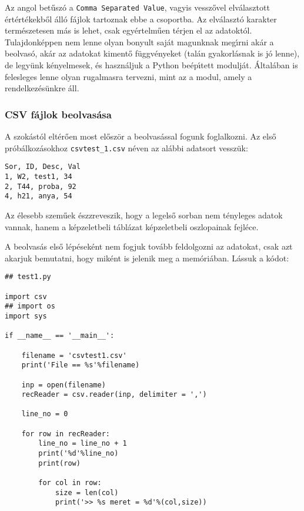 Az angol bet\H{u}sz\'o a {\tt Comma Separated Value}, vagyis vessz\H{o}vel elv\'alasztott 
\'ert\'ert\'ekekb\H{o}l \'all\'o f\'ajlok tartoznak ebbe a csoportba. Az elv\'alaszt\'o 
karakter term\'eszetesen m\'as is lehet, csak egy\'ertelm\H{u}en t\'erjen el az adatokt\'ol. 
Tulajdonk\'eppen nem lenne olyan bonyult saj\'at magunknak meg\'{\i}rni ak\'ar a beolvas\'o, 
ak\'ar az adatokat kiment\H{o} f\"uggv\'enyeket (tal\'an gyakorl\'asnak is j\'o lenne), 
de legy\"unk k\'enyelmesek, \'es haszn\'aljuk a Python be\'ep\'{\i}tett modulj\'at. 
\'Altal\'aban is felesleges lenne olyan rugalmasra tervezni, mint az a modul, amely a 
rendelkez\'es\"unkre \'all.

\subsubsection{CSV f\'ajlok beolvas\'asa}

A szok\'ast\'ol elt\'er\H{o}en most el\H{o}sz\"or a beolvas\'assal fogunk foglalkozni. Az 
els\H{o} pr\'ob\'alkoz\'asokhoz {\tt csvtest\_1.csv} n\'even az al\'abbi adatsort vessz\"uk:

\begin{Verbatim}[fontsize=\small]
Sor, ID, Desc, Val
1, W2, test1, 34
2, T44, proba, 92
4, h21, anya, 54
\end{Verbatim}

\noindent Az \'elesebb szem\H{u}ek \'eszzreveszik, hogy a legels\H{o} sorban nem t\'enyleges adatok 
vannak, hanem a k\'epzeletbeli t\'abl\'azat k\'epzeletbeli oszlopainak fejl\'ece. 

A beolvas\'as els\H{o} l\'ep\'esek\'ent nem fogjuk tov\'abb feldolgozni az adatokat, csak azt akarjuk 
bemutatni, hogy mik\'ent is jelenik meg a mem\'ori\'aban. L\'assuk a k\'odot:

\begin{Verbatim}[fontsize=\small]
## test1.py

import csv
## import os
import sys

if __name__ == '__main__':

    filename = 'csvtest1.csv'
    print('File == %s'%filename)

    inp = open(filename)
    recReader = csv.reader(inp, delimiter = ',')

    line_no = 0

    for row in recReader:
        line_no = line_no + 1 
        print('%d'%line_no)
        print(row)

        for col in row:
            size = len(col)
            print('>> %s meret = %d'%(col,size))
\end{Verbatim}

